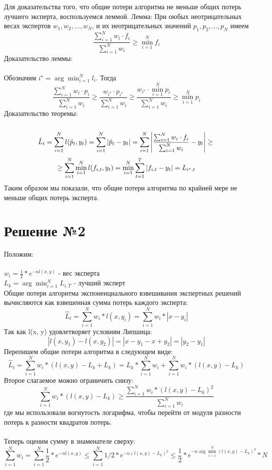 \documentclass{article}
\begin{document}
Для доказательства того, что общие потери алгоритма не меньше общих потерь лучшего эксперта, воспользуемся леммой.
Лемма: При оюбых неотрицательных весах экспертов $w_1, w_2, ..., w_N$, и их неотрицательных значений  $p_1, p_2, ..., p_N$ имеем
$$
\frac{\sum_{i=1}^N w_i\cdot f_i}{\sum_{i=1}^N w_i} \geq \min_{i=1}^N f_i
$$
Доказательство леммы: \\\\
Обозначим $i^\star = \arg\min_{i=1}^N l_i$. Тогда
$$
\frac{\sum_{i=1}^N w_i\cdot p_i}{\sum_{i=1}^N w_i} \geq \frac{w_{i^\star} \cdot p_{i^\star}}{\sum_{i=1}^N w_i} \geq \frac{w_{i^\star} \cdot \min_{i=1}^N p_i}{\sum_{i=1}^N w_i} \geq \min_{i=1}^N p_i
$$
Доказательство теоремы: \\\\
$$
\hat{L}_t = \sum_{i=1}^N l(\hat{p}_t, y_t) = \sum_{i=1}^N |\hat{p}_t - y_t| = \sum_{i=1}^N \left|\frac{\sum_{i=1}^N w_i\cdot f_i}{\sum_{i=1}^N w_i} - y_t\right| \geq \\
$$
$$
\geq \sum_{i=1}^N \min_{i=1}^N l(f_{i,t},y_t) = \min_{i=1}^N \sum_{t=1}^T \left|f_{i,t} - y_t\right| = L_{i^\star,t} \\\\
$$
Таким образом мы показали, что общие потери алгоритма по крайней мере не меньше общих потерь эксперта.

\section{Решение №2}

Положим: \\\\
$w_i=\frac{1}{2}*e^{-nl(x,y)}$ - вес эксперта \\
$L_k = \arg\min_{i=1}^N L_{i,T}$ - лучший эксперт \\

Общие потери алгоритма экспоненциального взвешивания экспертных решений вычисляются как взвешенная сумма потерь каждого эксперта:
$$
\hat{L}_t = \sum_{i=1}^N w_i*l(x,y_i) = \sum_{i=1}^N w_i*|x-y_i|
$$
Так как l(x, y) удовлетворяет условиям Липшица:
$$
|l(x,y_1)-l(x,y_2)| = |x-y_1-x+y_2| = |y_2-y_1|
$$
Перепишем общие потери алгоритма в следующем виде:
$$
\hat{L}_t = \sum_{i=1}^N w_i*(l(x,y)-L_k+L_k) = L_k*\sum_{i=1}^N w_i+\sum_{i=1}^N w_i*(l(x,y)-L_k)
$$
Второе слагаемое можно ограничить снизу:
$$
\sum_{i=1}^N w_i*(l(x,y)-L_k) \geq \frac{\sum_{i=1}^N w_i*(l(x,y)-L_k)^2}{\sum_{i=1}^N w_i}
$$
где мы использовали вогнутость логарифма, чтобы перейти от модуля разности потерь к разности квадратов потерь. \\\\
Теперь оценим сумму в знаменателе сверху:
$$
\sum_{i=1}^N w_i=\sum_{i=1}^N \frac{1}{2}*e^{-nl(x,y)}
\leq \sum_{i=1}^N 1/2*e^{-n(l(x,y)-L_k)^2}
\leq \frac{1}{2}*e^{-n\arg\min_{i=1}^N (l(x,y)-L_k)^2}*N
$$
\end{document}
